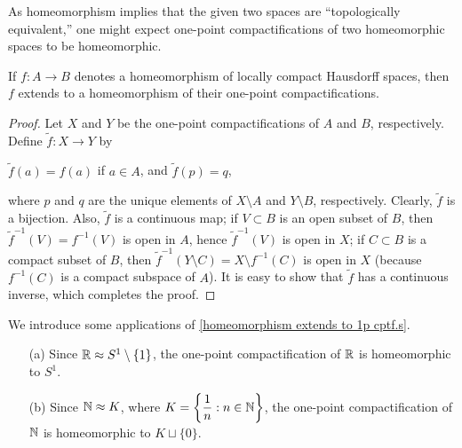 As homeomorphism implies that the given two spaces are ``topologically equivalent,'' one might expect one-point compactifications of two homeomorphic spaces to be homeomorphic.
\begin{thm}\label{homeomorphism extends to 1p cptf.s}
    If $f: A\rightarrow B$ denotes a homeomorphism of locally compact Hausdorff spaces, then $f$ extends to a homeomorphism of their one-point compactifications.
\end{thm}
\begin{proof}
    Let $X$ and $Y$ be the one-point compactifications of $A$ and $B$, respectively.
    Define $\tilde{f}: X\rightarrow Y$ by
    \begin{center}
        $\tilde{f}(a)=f(a)$ if $a\in A$, and $\tilde{f}(p)=q$,
    \end{center}
    where $p$ and $q$ are the unique elements of $X\setminus A$ and $Y\setminus B$, respectively.
    Clearly, $\tilde{f}$ is a bijection.
    Also, $\tilde{f}$ is a continuous map; if $V\subset B$ is an open subset of $B$, then $\tilde{f}^{-1}(V)=f^{-1}(V)$ is open in $A$, hence $\tilde{f}^{-1}(V)$ is open in $X$; if $C\subset B$ is a compact subset of $B$, then $\tilde{f}^{-1}(Y\setminus C)=X\setminus f^{-1}(C)$ is open in $X$ (because $f^{-1}(C)$ is a compact subspace of $A$).
    It is easy to show that $\tilde{f}$ has a continuous inverse, which completes the proof.
\end{proof}
\begin{exmp}
    We introduce some applications of \cref{homeomorphism extends to 1p cptf.s}.
    \begin{enumerate}
        \item[(a)] Since ${\mathbb{R}}\approx S^1\setminus\{1\}$, the one-point compactification of ${\mathbb{R}}$ is homeomorphic to $S^1$.
        \item[(b)] Since ${\mathbb{N}}\approx K$, where $K=\left\{\dfrac{1}{n}: n\in{\mathbb{N}}\right\}$, the one-point compactification of ${\mathbb{N}}$ is homeomorphic to $K\sqcup\{0\}$.
    \end{enumerate}
\end{exmp}